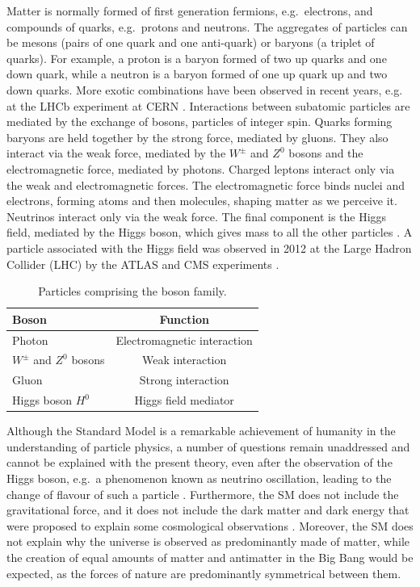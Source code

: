 Matter is normally formed of first generation fermions, e.g.\ electrons, and compounds of quarks, e.g.\ protons and neutrons. The aggregates of particles can be mesons (pairs of one quark and one anti-quark) or baryons (a triplet of quarks). For example, a proton is a baryon formed of two up quarks and one down quark, while a neutron is a baryon formed of one up quark up and two down quarks. More exotic  combinations have been observed in recent years, e.g. at the LHCb experiment at CERN \cite{LHCb:tetraquark,LHCb:pentaquark, LHCb:pentaquark2}. Interactions between subatomic particles are mediated by the exchange of bosons, particles of integer spin. Quarks forming baryons are held together by the strong force, mediated by gluons. They also interact via the weak force, mediated by the $W^\pm$ and $Z^0$ bosons and the electromagnetic force, mediated by photons. Charged leptons interact only via the weak and electromagnetic forces. The electromagnetic force binds nuclei and electrons, forming atoms and then molecules, shaping matter as we perceive it. Neutrinos interact only via the weak force. The final component is the Higgs field, mediated by the Higgs boson, which gives mass to all the other particles \cite{PhysRevLett.13.508}. A particle associated with the Higgs field was observed in 2012 at the Large Hadron Collider (LHC) \cite{LHC:cdr} by the ATLAS and CMS experiments  \cite{ATLAS:Higgs, CMS:Higgs}.

\begin{table}[!t]
  \centering
    \begin{tabular}{l c }
    \toprule
    Boson & Function\\
    \midrule
    Photon                    & Electromagnetic interaction\\
    $W^\pm$ and $Z^0$ bosons  & Weak interaction\\
    Gluon                     & Strong interaction\\
    Higgs boson $H^0$         & Higgs field mediator\\
    \bottomrule
    \end{tabular}
  \caption{Particles comprising the boson family.} \label{tab:Bosons}
\end{table}

Although the Standard Model is a remarkable achievement of humanity in the understanding of particle physics, a number of questions remain unaddressed and cannot be explained with the present theory, even after the observation of the Higgs boson, e.g.\ a phenomenon known as neutrino oscillation, leading to the change of flavour of such a particle \cite{nobel-neutrino-osc}. Furthermore, the SM does not include the gravitational force, and it does not include the dark matter and dark energy that were proposed to explain some cosmological observations \cite{RevModPhys.75.559}. Moreover, the SM does not explain why the universe is observed as predominantly made of matter, while the creation of equal amounts of matter and antimatter in the Big Bang would be expected, as the forces of nature are predominantly symmetrical between them.

